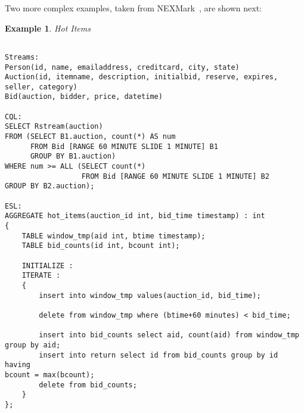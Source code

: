 \documentclass[10pt]{report}
\newtheorem{example}{Example}
\begin{document}
Two more complex examples, taken from NEXMark~\cite{NEXMark}, are shown next:
\begin{example}{Hot Items}
\begin{verbatim}

Streams: 
Person(id, name, emailaddress, creditcard, city, state)
Auction(id, itemname, description, initialbid, reserve, expires, seller, category)
Bid(auction, bidder, price, datetime)

CQL:
SELECT Rstream(auction)
FROM (SELECT B1.auction, count(*) AS num
      FROM Bid [RANGE 60 MINUTE SLIDE 1 MINUTE] B1
      GROUP BY B1.auction)
WHERE num >= ALL (SELECT count(*)
                  FROM Bid [RANGE 60 MINUTE SLIDE 1 MINUTE] B2
GROUP BY B2.auction);

ESL:
AGGREGATE hot_items(auction_id int, bid_time timestamp) : int
{
    TABLE window_tmp(aid int, btime timestamp);
    TABLE bid_counts(id int, bcount int);

    INITIALIZE :
    ITERATE :
    {
        insert into window_tmp values(auction_id, bid_time);

        delete from window_tmp where (btime+60 minutes) < bid_time;

        insert into bid_counts select aid, count(aid) from window_tmp
group by aid;
        insert into return select id from bid_counts group by id having
bcount = max(bcount);
        delete from bid_counts;
    }
};

\end{verbatim}
\end{example}
\end{document}
